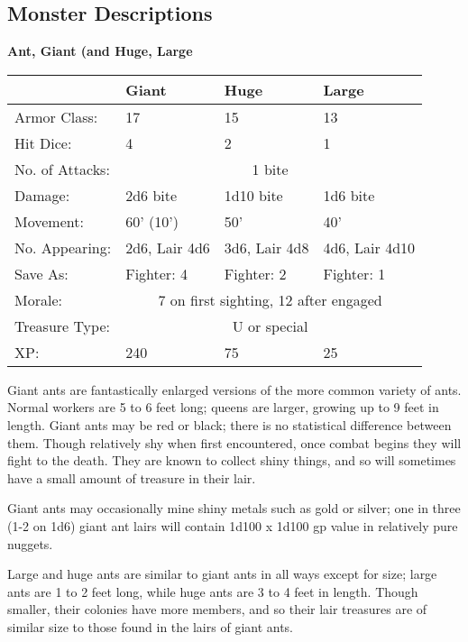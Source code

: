 \documentclass[a4paper,twoside,openany,10pt]{book}
\begin{document}
\pagebreak

\subsection{Monster Descriptions}\label{monster-descriptions}

\begin{multicols}{2}

\textbf{Ant, Giant (and Huge, Large}\label{ant-giant-and-huge-large}

\begin{flushleft}
	\begin{tabularx}{0.48\textwidth}{lXXX} & \textbf{Giant} & \textbf{Huge} & \textbf{Large} \\\hline
Armor Class: & 17 & 15 & 13 \\\hline
Hit Dice: & 4 & 2 & 1 \\\hline
No. of Attacks: &\multicolumn{3}{c}{1 bite} \\\hline
Damage: & 2d6 bite & 1d10 bite & 1d6 bite \\\hline
Movement: & 60' (10') & 50' & 40' \\\hline
No. Appearing: & 2d6, Lair 4d6 & 3d6, Lair 4d8 & 4d6, Lair 4d10 \\\hline
Save As: & Fighter: 4 & Fighter: 2 & Fighter: 1 \\\hline
Morale: & \multicolumn{3}{c}{ 7 on first sighting, 12 after engaged} \\\hline
Treasure Type:&\multicolumn{3}{c}{U or special} \\\hline
XP: & 240 & 75 & 25 \\
\end{tabularx}
\end{flushleft}
\medskip

Giant ants are fantastically enlarged versions of the more common variety of ants. Normal workers are 5 to 6 feet long; queens are larger, growing up to 9 feet in length. Giant ants may be red or black; there is no statistical difference between them. Though relatively shy when first encountered, once combat begins they will fight to the death. They are known to collect shiny things, and so will sometimes have a small amount of treasure in their lair. 

Giant ants may occasionally mine shiny metals such as gold or silver; one in three (1-2 on 1d6) giant ant lairs will contain 1d100 x 1d100 gp value in relatively pure nuggets.

Large and huge ants are similar to giant ants in all ways except for size; large ants are 1 to 2 feet long, while huge ants are 3 to 4 feet in length. Though smaller, their colonies have more members, and so their lair treasures are of similar size to those found in the lairs of giant ants.


\end{multicols}
\end{document}
